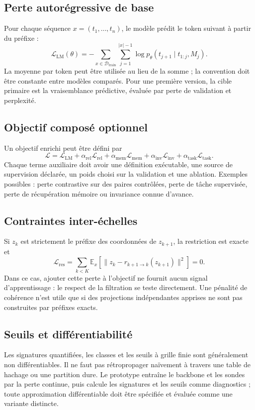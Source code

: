 \documentclass[11pt,a4paper]{article}
\theoremstyle{remark}
\newcommand{\D}{\mathcal D}
\newcommand{\E}{\mathbb E}
\begin{document}
\subsection{Perte autorégressive de base}
Pour chaque séquence $x=(t_1,\ldots,t_n)$, le modèle prédit le token suivant à partir du préfixe :
\[
\boxed{\mathcal L_{\mathrm{LM}}(\theta)=-\sum_{x\in\D_{\mathrm{train}}}\sum_{j=1}^{|x|-1}\log p_\theta(t_{j+1}\mid t_{1:j},M_j).}
\]
La moyenne par token peut être utilisée au lieu de la somme ; la convention doit être constante entre modèles comparés. Pour une première version, la cible primaire est la vraisemblance prédictive, évaluée par perte de validation et perplexité.

\subsection{Objectif composé optionnel}
Un objectif enrichi peut être défini par
\[
\mathcal L=\mathcal L_{\mathrm{LM}}+\alpha_{\mathrm{rel}}\mathcal L_{\mathrm{rel}}+\alpha_{\mathrm{mem}}\mathcal L_{\mathrm{mem}}+\alpha_{\mathrm{inv}}\mathcal L_{\mathrm{inv}}+\alpha_{\mathrm{task}}\mathcal L_{\mathrm{task}}.
\]
Chaque terme auxiliaire doit avoir une définition exécutable, une source de supervision déclarée, un poids choisi sur la validation et une ablation. Exemples possibles : perte contrastive sur des paires contrôlées, perte de tâche supervisée, perte de récupération mémoire ou invariance connue d'avance.

\subsection{Contraintes inter-échelles}
Si $z_k$ est strictement le préfixe des coordonnées de $z_{k+1}$, la restriction est exacte et
\[
\mathcal L_{\mathrm{res}}=\sum_{k<K}\E_x\left[\|z_k-r_{k+1\to k}(z_{k+1})\|^2\right]=0.
\]
Dans ce cas, ajouter cette perte à l'objectif ne fournit aucun signal d'apprentissage : le respect de la filtration se teste directement. Une pénalité de cohérence n'est utile que si des projections indépendantes apprises ne sont pas construites par préfixes exacts.

\subsection{Seuils et différentiabilité}
Les signatures quantifiées, les classes et les seuils à grille finie sont généralement non différentiables. Il ne faut pas rétropropager naïvement à travers une table de hachage ou une partition dure. Le prototype entraîne le backbone et les sondes par la perte continue, puis calcule les signatures et les seuils comme diagnostics ; toute approximation différentiable doit être spécifiée et évaluée comme une variante distincte.
\end{document}
